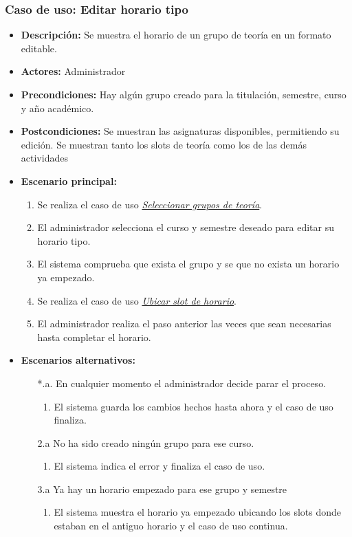 \documentclass{book}
\begin{document}
\subsubsection*{Caso de uso: Editar horario tipo}
\begin{itemize}
\item{\bf Descripción:} Se muestra el horario de un grupo de teoría en un formato editable.
\item{\bf Actores:} Administrador
\item{\bf Precondiciones:} Hay algún grupo creado para la titulación, semestre, curso y año académico.
\item{\bf Postcondiciones:} Se muestran las asignaturas disponibles, permitiendo su edición. Se muestran tanto los slots de teoría como los de las demás actividades
\item{\bf Escenario principal:}
	\begin{enumerate}
	\item Se realiza el caso de uso {\em \hyperref[select_grupo]{Seleccionar grupos de teoría}}.
	\item El administrador selecciona el curso y semestre deseado para editar su horario tipo.
	\item El sistema comprueba que exista el grupo y se que no exista un horario ya empezado.
	\item Se realiza el caso de uso {\em \hyperref[guardar_slot]{Ubicar slot de horario}}.
	\item El administrador realiza el paso anterior las veces que sean necesarias hasta completar el horario.
	\end{enumerate}
\item{\bf Escenarios alternativos:}
	\begin{itemize}
		\item[*.a.] En cualquier momento el administrador decide parar el proceso.
		\begin{enumerate}
			\item El sistema guarda los cambios hechos hasta ahora y el caso de uso finaliza.
		\end{enumerate}
		\item[2.a] No ha sido creado ningún grupo para ese curso.
		\begin{enumerate}
			\item El sistema indica el error y finaliza el caso de uso.
		\end{enumerate}
		\item[3.a] Ya hay un horario empezado para ese grupo y semestre
		\begin{enumerate}
			\item El sistema muestra el horario ya empezado ubicando los slots donde estaban en el antiguo horario y el caso de uso continua.
		\end{enumerate}
	\end{itemize}
\end{itemize}
\end{document}

